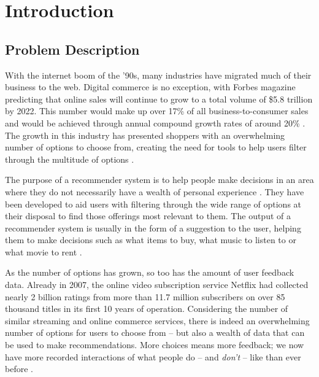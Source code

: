 \chapter{Introduction}

\label{intro} %

\section{Problem Description}
With the internet boom of the '90s, many industries have migrated much of their business to the web. Digital commerce is no exception, with Forbes magazine predicting that online sales will continue to grow to a total volume of \$5.8 trillion by 2022. This number would make up over 17\% of all business-to-consumer sales and would be achieved through annual compound growth rates of around 20\% \parencite{forbes2018growth}. The growth in this industry has presented shoppers with an overwhelming number of options to choose from, creating the need for tools to help users filter through the multitude of options \parencite{handbook_1.1_intro}.

The purpose of a recommender system is to help people make decisions in an area where they do not necessarily have a wealth of personal experience \parencite{rs_1.1_Resnick}. They have been developed to aid users with filtering through the wide range of options at their disposal to find those offerings most relevant to them. The output of a recommender system is usually in the form of a suggestion to the user, helping them to make decisions such as what items to buy, what music to listen to or what movie to rent \parencite{handbook_1.1_intro}.

As the number of options has grown, so too has the amount of user feedback data. Already in 2007, the online video subscription service Netflix had collected nearly 2 billion ratings from more than 11.7 million subscribers on over 85 thousand titles in its first 10 years of operation. Considering the number of similar streaming and online commerce services, there is indeed an overwhelming number of options for users to choose from -- but also a wealth of data that can be used to make recommendations. More choices means more feedback; we now have more recorded interactions of what people do -- and \textit{don't} -- like than ever before \parencite{netflix_description}.

